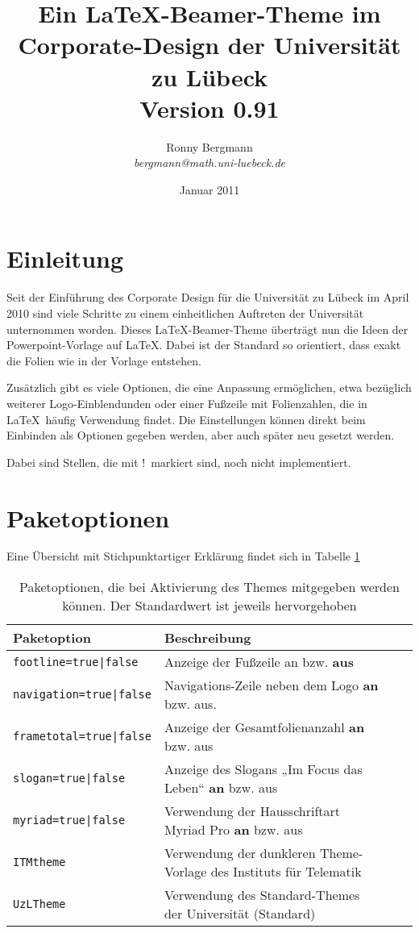 \documentclass[a4paper,DIV=calc, oneside]{scrartcl}
\newcommand{\missing}{{\color{red}!}}
\begin{document}
	\thispagestyle{empty}
\title{\vspace{-3\baselineskip}Ein \textnormal{\LaTeX}-Beamer-Theme im Corporate-Design der Universität zu Lübeck\\{\large\normalfont Version 0.91}}
\author{Ronny Bergmann\\\emph{bergmann@math.uni-luebeck.de}}
\date{Januar 2011}
\maketitle
\section{Einleitung}
Seit der Einführung des Corporate Design für die Universität zu Lübeck im April 2010 sind viele Schritte zu einem einheitlichen Auftreten der Universität unternommen worden. Dieses \LaTeX-Beamer-Theme überträgt nun die Ideen der
Powerpoint-Vorlage auf \LaTeX. Dabei ist der Standard so orientiert, dass exakt die Folien wie in der Vorlage entstehen.

Zusätzlich gibt es viele Optionen, die eine Anpassung ermöglichen, etwa bezüglich weiterer Logo-Einblendunden oder
einer Fußzeile mit Folienzahlen, die in \LaTeX\ häufig Verwendung findet. Die Einstellungen können direkt beim Einbinden als Optionen gegeben werden, aber auch später neu gesetzt werden.

Dabei sind Stellen, die mit \missing\  markiert sind, noch nicht implementiert.

\section{Paketoptionen}
Eine Übersicht mit Stichpunktartiger Erklärung findet sich in Tabelle \ref{tab:Paketoptionen}
\begin{table}[hbt]
	\begin{tabular}{llll}
		\toprule
		\textbf{Paketoption} & \textbf{Beschreibung}\\\midrule
		\lstinline!footline=true|false! & Anzeige der Fußzeile an bzw. \textbf{aus}\\
		\lstinline!navigation=true|false! & Navigations-Zeile neben dem Logo \textbf{an} bzw. aus.\\
		\lstinline!frametotal=true|false! & Anzeige der Gesamtfolienanzahl \textbf{an} bzw. aus\\
		\lstinline!slogan=true|false! & Anzeige des Slogans „Im Focus das Leben“ \textbf{an} bzw. aus\\
		\lstinline!myriad=true|false! & Verwendung der Hausschriftart Myriad Pro \textbf{an} bzw. aus\\
		\lstinline!ITMtheme! & Verwendung der dunkleren Theme-Vorlage des Instituts für Telematik\\
		\lstinline!UzLTheme! & Verwendung des Standard-Themes der Universität (Standard)\\\bottomrule
	\end{tabular}
	\caption{Paketoptionen, die bei Aktivierung des Themes mitgegeben werden können. Der Standardwert ist jeweils hervorgehoben}
	\label{tab:Paketoptionen}
\end{table}
\end{document}

